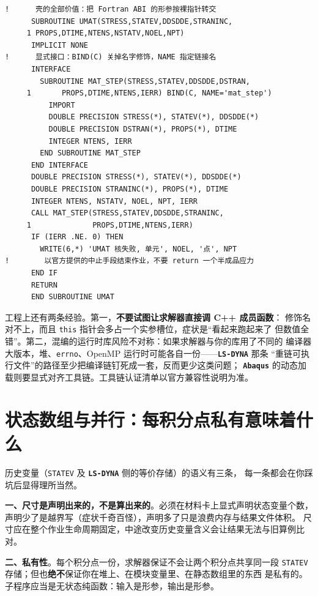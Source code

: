 \documentclass[12pt,a4paper,fontset=fandol]{ctexbook}
\newcommand{\Tp}[1]{\texttt{#1}}
\newcommand{\Lib}[1]{\textbf{\texttt{#1}}}
\newcommand{\Lang}[1]{\textsf{#1}}
\newcommand{\CPP}{\Lang{C++}}
\begin{document}
\begin{lstlisting}[language={[95]Fortran}, style=fortranstyle, caption={Fortran 壳：显式 interface 加
\Tp{BIND(C)} 声明，把官方形参原样转交给 \Tp{mat\_step}}, label={lst:ch05-fortran-shell}]
!      壳的全部价值：把 Fortran ABI 的形参按裸指针转交
      SUBROUTINE UMAT(STRESS,STATEV,DDSDDE,STRANINC,
     1 PROPS,DTIME,NTENS,NSTATV,NOEL,NPT)
      IMPLICIT NONE
!      显式接口：BIND(C) 关掉名字修饰，NAME 指定链接名
      INTERFACE
        SUBROUTINE MAT_STEP(STRESS,STATEV,DDSDDE,DSTRAN,
     1       PROPS,DTIME,NTENS,IERR) BIND(C, NAME='mat_step')
          IMPORT
          DOUBLE PRECISION STRESS(*), STATEV(*), DDSDDE(*)
          DOUBLE PRECISION DSTRAN(*), PROPS(*), DTIME
          INTEGER NTENS, IERR
        END SUBROUTINE MAT_STEP
      END INTERFACE
      DOUBLE PRECISION STRESS(*), STATEV(*), DDSDDE(*)
      DOUBLE PRECISION STRANINC(*), PROPS(*), DTIME
      INTEGER NTENS, NSTATV, NOEL, NPT, IERR
      CALL MAT_STEP(STRESS,STATEV,DDSDDE,STRANINC,
     1              PROPS,DTIME,NTENS,IERR)
      IF (IERR .NE. 0) THEN
        WRITE(6,*) 'UMAT 核失败, 单元', NOEL, '点', NPT
!        以官方提供的中止手段结束作业，不要 return 一个半成品应力
      END IF
      RETURN
      END SUBROUTINE UMAT
\end{lstlisting}

工程上还有两条经验。第一，\textbf{不要试图让求解器直接调 \CPP{} 成员函数}：
修饰名对不上，而且 \Tp{this} 指针会多占一个实参槽位，症状是``看起来跑起来了
但数值全错''。第二，混编的运行时库风险不对称：如果求解器与你的库用了不同的
编译器大版本，堆、\Tp{errno}、OpenMP 运行时可能各自一份——\Lib{LS-DYNA} 那条
``重链可执行文件''的路径至少把编译链钉死成一套，反而更少这类问题；
\Lib{Abaqus} 的动态加载则要显式对齐工具链。工具链认证清单以官方兼容性说明为准。

\section{状态数组与并行：每积分点私有意味着什么}
\label{sec:ch05-statev-parallel}

历史变量（\Tp{STATEV} 及 \Lib{LS-DYNA} 侧的等价存储）的语义有三条，
每一条都会在你踩坑后显得理所当然。

\textbf{一、尺寸是声明出来的，不是算出来的}。必须在材料卡上显式声明状态变量个数，
声明少了是越界写（症状千奇百怪），声明多了只是浪费内存与结果文件体积。
尺寸应在整个作业生命周期固定，中途改变历史变量含义会让结果无法与旧算例比对。

\textbf{二、私有性}。每个积分点一份，求解器保证不会让两个积分点共享同一段
\Tp{STATEV} 存储；但也\textbf{绝不}保证你在堆上、在模块变量里、在静态数组里的东西
是私有的。子程序应当是无状态纯函数：输入是形参，输出是形参。
\end{document}
